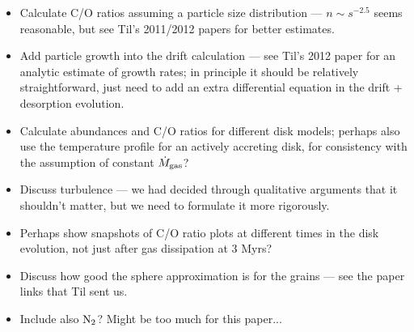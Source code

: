 \documentclass[12pt, preprint]{aastex}
\begin{document}
\begin{itemize}
\item Calculate C/O ratios assuming a particle size distribution --- $n \sim s^{-2.5}$ seems reasonable, but see Til's 2011/2012 papers for better estimates.
\item Add particle growth into the drift calculation --- see Til's 2012 paper for an analytic estimate of growth rates; in principle it should be relatively straightforward, just need to add an extra differential equation in the drift + desorption evolution.
\item Calculate abundances and C/O ratios for different disk models; perhaps also use the temperature profile for an actively accreting disk, for consistency with the assumption of constant $\dot{M}_{\rm gas}$?
\item Discuss turbulence --- we had decided through qualitative arguments that it shouldn't matter, but we need to formulate it more rigorously.
\item Perhaps show snapshots of C/O ratio plots at different times in the disk evolution, not just after gas dissipation at 3 Myrs?
\item Discuss how good the sphere approximation is for the grains --- see the paper links that Til sent us.
\item Include also $\rm N_2$? Might be too much for this paper... 
\end{itemize}
     





\end{document}
